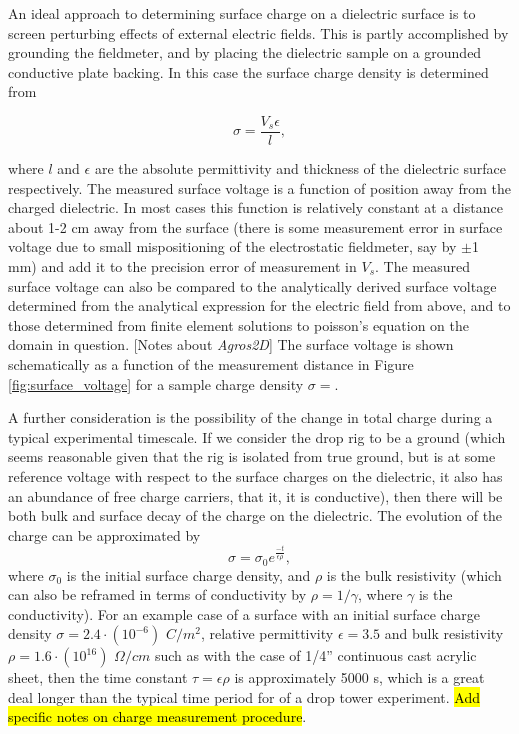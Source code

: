 \documentclass[10pt,a4paper]{article}
\begin{document}
An ideal approach to determining surface charge on a dielectric surface is to screen perturbing effects of external electric fields. This is partly accomplished by grounding the fieldmeter, and by placing the dielectric sample on a grounded conductive plate backing. In this case the surface charge density is determined from

\[ \sigma = \frac{V_s \epsilon}{l}, \]

where $l$ and $\epsilon$ are the absolute permittivity and thickness of the dielectric surface respectively. The measured surface voltage is a function of position away from the charged dielectric. In most cases this function is relatively constant at a distance about 1-2 cm away from the surface (there is some measurement error in surface voltage due to small mispositioning of the electrostatic fieldmeter, say by $\pm$1 mm) and add it to the precision error of measurement in $V_s$. The measured surface voltage can also be compared to the analytically derived surface voltage determined from the analytical expression for the electric field from above, and to those determined from finite element solutions to poisson's equation on the domain in question. [Notes about \emph{Agros2D}] The surface voltage is shown schematically as a function of the measurement distance in Figure \ref{fig:surface_voltage} for a sample charge density $\sigma = $.

A further consideration is the possibility of the change in total charge during a typical experimental timescale. If we consider the drop rig to be a ground (which seems reasonable given that the rig is isolated from true ground, but is at some reference voltage with respect to the surface charges on the dielectric, it also has an abundance of free charge carriers, that it, it is conductive), then there will be both bulk and surface decay of the charge on the dielectric. The evolution of the charge can be approximated by
\[ \sigma = \sigma_0 e^{\frac{-t}{\epsilon \rho}}, \]
where $\sigma_0$ is the initial surface charge density, and $\rho$ is the bulk resistivity (which can also be reframed in terms of conductivity by $\rho = 1/\gamma$, where $\gamma$ is the conductivity). For an example case of a surface with an initial surface charge density $\sigma = 2.4 \cdot (10^{-6})$ $C/m^2$, relative permittivity $\epsilon = 3.5$ and bulk resistivity $\rho = 1.6 \cdot (10^{16})$ $\Omega/cm$ such as with the case of 1/4'' continuous cast acrylic sheet, then the time constant $\tau = \epsilon \rho$ is approximately 5000 s, which is a great deal longer than the typical time period for of a drop tower experiment. \hl{Add specific notes on charge measurement procedure}.
\end{document}
